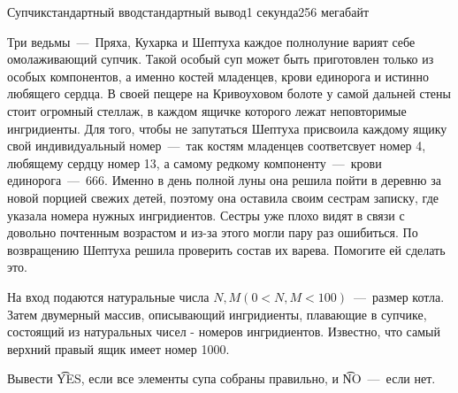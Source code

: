 \begin{problem}{Супчик}{стандартный ввод}{стандартный вывод}{1 секунда}{256 мегабайт}

\begin{figure}[h]
\end{figure}

Три ведьмы~---~Пряха, Кухарка и Шептуха каждое полнолуние варият себе омолаживающий супчик. Такой особый суп может быть приготовлен только из особых компонентов, а именно костей младенцев, 
крови единорога и истинно любящего сердца. В своей пещере на Кривоуховом болоте у самой дальней стены стоит огромный стеллаж, в каждом ящичке которого лежат неповторимые ингридиенты.
Для того, чтобы не запутаться Шептуха присвоила каждому ящику свой индивидуальный номер~---~так костям младенцев соответсвует номер 4, любящему сердцу номер 13, а самому редкому компоненту~---~крови единорога~---~666. 
Именно в день полной луны она решила пойти в деревню за новой порцией свежих детей, поэтому
она оставила своим сестрам записку, где указала номера нужных ингридиентов. Сестры уже плохо видят в связи с довольно почтенным возрастом и из-за этого могли пару раз ошибиться.
По возвращению Шептуха решила проверить состав их варева. Помогите ей сделать это.


\InputFile
На вход подаются натуральные числа $N, M (0 < N, M < 100)$~---~размер котла. Затем двумерный массив, описывающий ингридиенты, плавающие в супчике, состоящий из натуральных чисел - номеров ингридиентов.
Известно, что самый верхний правый ящик имеет номер 1000.

\OutputFile
Вывести \t{YES}, если все элементы супа собраны правильно, и \t{NO}~---~если нет.

\Example

\begin{example}
%
\end{example}

\end{problem}

